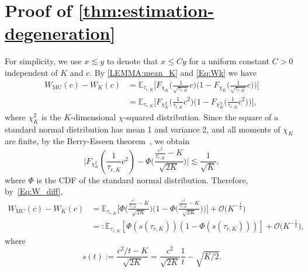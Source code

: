 \documentclass[%
onefignum,onetabnum]{siamonline250211}
\newcommand{\bbE}{\mathbb E}
\newcommand{\cO}{\mathcal O} \newcommand{\cP}{\mathcal P}
\begin{document}



\appendix
\section{Proof of \texorpdfstring{\cref{thm:estimation-degeneration}}{}}\label{app:1}
For simplicity, we use $x\lesssim y$ to denote that $x\leq Cy$ for a uniform constant $C>0$ independent of $K$ and $c$. By \cref{LEMMA:mean_K} and \eqref{Eq:Wk} we have
\begin{equation}\label{Eq:W_diff}
    \begin{aligned}
        W_{\mathrm{MC}}(c)-W_K(c) &= \bbE_{\tau_{r,K}}\Big[ F_{\chi_K}\Big( \frac{1}{\sqrt{\tau_{r,K}}}c \Big)\Big( 1-F_{\chi_K}\Big( \frac{1}{\sqrt{\tau_{r,K}}}c \Big) \Big) \Big] \\
        &= \bbE_{\tau_{r,K}}\Big[ F_{\chi_K^2}\Big( \frac{1}{\tau_{r,K}}c^2 \Big)\Big( 1-F_{\chi_K^2}\Big( \frac{1}{\tau_{r,K}}c^2 \Big) \Big) \Big],
    \end{aligned}
\end{equation}
where $\chi_K^2$ is the $K$-dimensional $\chi$-squared distribution. Since the square of a standard normal distribution has mean 1 and variance 2, and all moments of $\chi_K$ are finite, by the Berry-Esseen theorem~\cite[Sec.~3.4.4]{Durrett-book19}, we obtain
\begin{equation*}
    \bigg| F_{\chi_K^2}\left( \frac{1}{\tau_{r,K}}c^2 \right) - \Phi \bigg( \frac{\frac{c^2}{\tau_{r,K}}-K}{\sqrt{2K}} \bigg) \bigg| \lesssim \frac{1}{\sqrt{K}},
\end{equation*}
where $\Phi$ is the CDF of the standard normal distribution. Therefore, by~\eqref{Eq:W_diff},
\begin{equation}\label{Eq:W_diff2}
    \begin{aligned}
        W_{\mathrm{MC}}(c)-W_K(c) &= \bbE_{\tau_{r,K}}\bigg[ \Phi \bigg( \frac{\frac{c^2}{\tau_{r,K}}-K}{\sqrt{2K}} \bigg)\bigg( 1-\Phi \Big( \frac{\frac{c^2}{\tau_{r,K}}-K}{\sqrt{2K}} \Big) \Big) \bigg] + \cO \Big( K^{-\frac{1}{2}} \Big)\\
        &=: \bbE_{\tau_{r,K}}\left[ \Phi \left( s(\tau_{r,K}) \right)\left( 1-\Phi \left( s(\tau_{r,K}) \right) \right) \right] + \cO \Big( K^{-\frac{1}{2}} \Big),
    \end{aligned}
\end{equation}
where
\begin{equation}
    s(t):=\frac{{c^2}/{t}-K}{\sqrt{2K}}=\frac{c^2}{\sqrt{2K}}\frac{1}{t}-\sqrt{{K}/{2}}.
\end{equation}
\end{document}
